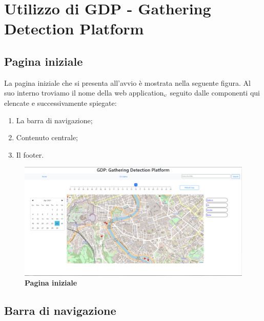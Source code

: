
\chapter{Utilizzo di GDP - Gathering Detection Platform}\label{UtilizzoDiGDPGatheringDetecionPlatform}

\section{Pagina iniziale}\label{UtilizzoDiGDPGatheringDetecionPlatformPaginaIniziale}
La pagina iniziale che si presenta all'avvio è mostrata nella seguente figura.
Al suo interno troviamo il nome della web application$_{\scaleto{G}{3pt}}$ seguito dalle componenti qui elencate e successivamente spiegate:
\begin{enumerate}
	\item La barra di navigazione;
	\item Contenuto centrale;
	\item Il footer.
\end{enumerate}

\begin{center}
	\begin{figure}[H]
		\centering\includegraphics[width=0.9\linewidth]{../immagini/manualeUtente/mainpage.png}
		\caption{\textbf{\textbf{\textbf{Pagina iniziale}}}}
	\end{figure}
\end{center}

\section{Barra di navigazione}\label{UtilizzoDiGDPGatheringDetecionPlatformBarraDiNavigazione}

